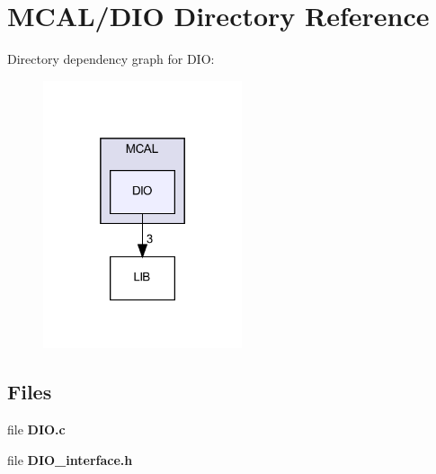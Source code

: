 \section{M\+C\+A\+L/\+D\+IO Directory Reference}
\label{dir_8439cbf7440b5bdef3b055efe8d89058}
Directory dependency graph for D\+IO\+:
\nopagebreak
\begin{figure}[H]
\begin{center}
\leavevmode
\includegraphics[width=166pt]{dir_8439cbf7440b5bdef3b055efe8d89058_dep}
\end{center}
\end{figure}
\subsection*{Files}
\begin{DoxyCompactItemize}
\item 
file \textbf{ D\+I\+O.\+c}
\item 
file \textbf{ D\+I\+O\+\_\+interface.\+h}
\end{DoxyCompactItemize}
